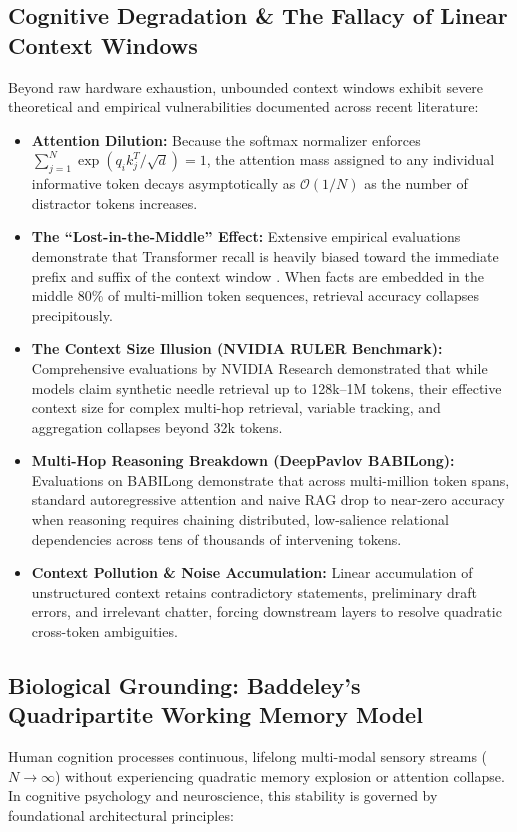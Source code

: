 \documentclass[11pt,a4paper]{article}
\begin{document}
\subsection{Cognitive Degradation \& The Fallacy of Linear Context Windows}
Beyond raw hardware exhaustion, unbounded context windows exhibit severe theoretical and empirical vulnerabilities documented across recent literature:
\begin{itemize}
    \item \textbf{Attention Dilution:} Because the softmax normalizer enforces $\sum_{j=1}^N \exp(q_i k_j^T / \sqrt{d}) = 1$, the attention mass assigned to any individual informative token decays asymptotically as $\mathcal{O}(1/N)$ as the number of distractor tokens increases.
    \item \textbf{The ``Lost-in-the-Middle'' Effect:} Extensive empirical evaluations demonstrate that Transformer recall is heavily biased toward the immediate prefix and suffix of the context window \cite{liu2024lost}. When facts are embedded in the middle 80\% of multi-million token sequences, retrieval accuracy collapses precipitously.
    \item \textbf{The Context Size Illusion (NVIDIA RULER Benchmark):} Comprehensive evaluations by NVIDIA Research \cite{hsieh2024ruler} demonstrated that while models claim synthetic needle retrieval up to 128k--1M tokens, their effective context size for complex multi-hop retrieval, variable tracking, and aggregation collapses beyond 32k tokens.
    \item \textbf{Multi-Hop Reasoning Breakdown (DeepPavlov BABILong):} Evaluations on BABILong \cite{kurilenko2024babilong} demonstrate that across multi-million token spans, standard autoregressive attention and naive RAG drop to near-zero accuracy when reasoning requires chaining distributed, low-salience relational dependencies across tens of thousands of intervening tokens.
    \item \textbf{Context Pollution \& Noise Accumulation:} Linear accumulation of unstructured context retains contradictory statements, preliminary draft errors, and irrelevant chatter, forcing downstream layers to resolve quadratic cross-token ambiguities.
\end{itemize}

\subsection{Biological Grounding: Baddeley's Quadripartite Working Memory Model}
Human cognition processes continuous, lifelong multi-modal sensory streams ($N \to \infty$) without experiencing quadratic memory explosion or attention collapse. In cognitive psychology and neuroscience, this stability is governed by foundational architectural principles:
\end{document}
